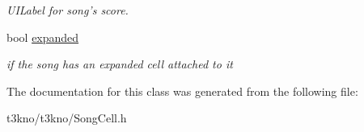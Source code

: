 \begin{DoxyCompactItemize}
\begin{DoxyCompactList}\small\item\em U\-I\-Label for song's score. \end{DoxyCompactList}\item 
\hypertarget{interface_song_cell_a509de781a41934b9e43ee410f0eb8a03}{bool \hyperlink{interface_song_cell_a509de781a41934b9e43ee410f0eb8a03}{expanded}}\label{interface_song_cell_a509de781a41934b9e43ee410f0eb8a03}

\begin{DoxyCompactList}\small\item\em if the song has an expanded cell attached to it \end{DoxyCompactList}\end{DoxyCompactItemize}


The documentation for this class was generated from the following file\-:\begin{DoxyCompactItemize}
\item 
t3kno/t3kno/Song\-Cell.\-h\end{DoxyCompactItemize}
